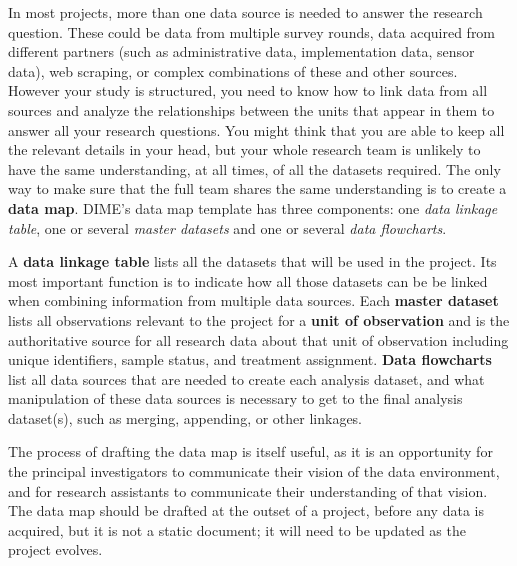 In most projects, more than one data source is needed to answer the research question.
These could be data from multiple survey rounds,
data acquired from different partners (such as administrative data, implementation data, sensor data),
web scraping,
or complex combinations of these and other sources.
However your study is structured, you need to know how to link data from all sources
and analyze the relationships between the units that appear in them
to answer all your research questions.
You might think that you are able to keep all the relevant details in your head,
but your whole research team is unlikely to have the same understanding,
at all times, of all the datasets required.
The only way to make sure that the full team shares the same understanding
is to create a \textbf{data map}.
DIME's data map template has three components:
one \textit{data linkage table},
one or several \textit{master datasets}
and one or several \textit{data flowcharts}.

A \textbf{data linkage table}
lists all the datasets that will be used in the project.
Its most important function is to indicate
how all those datasets can be be linked when
combining information from multiple data sources.
Each \textbf{master dataset}
lists all observations relevant to the project
for a \textbf{unit of observation}
and is the authoritative source for all research data
about that unit of observation
including unique identifiers, sample status, and treatment assignment.
\textbf{Data flowcharts}
list all data sources that are needed to create each analysis dataset,
and what manipulation of these data sources is necessary
to get to the final analysis dataset(s),
such as merging, appending, or other linkages.

The process of drafting the data map is itself useful,
as it is an opportunity for the principal investigators
to communicate their vision of the data environment,
and for research assistants to communicate
their understanding of that vision.
The data map should be drafted at the outset of a project,
before any data is acquired,
but it is not a static document;
it will need to be updated as the project evolves.

